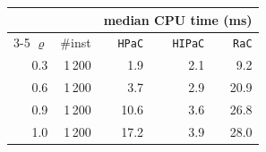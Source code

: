 \begin{tabular}{@{}rrrrr@{}}
\toprule
 &  & \multicolumn{3}{c}{median CPU time (ms)} \\
\cmidrule(l){3-5}
$\varrho$ & \#inst & \texttt{HPaC} & \texttt{HIPaC} & \texttt{RaC} \\
\midrule
0.3 & 1\,200 & 1.9 & 2.1 & 9.2 \\
0.6 & 1\,200 & 3.7 & 2.9 & 20.9 \\
0.9 & 1\,200 & 10.6 & 3.6 & 26.8 \\
1.0 & 1\,200 & 17.2 & 3.9 & 28.0 \\
\bottomrule
\end{tabular}
